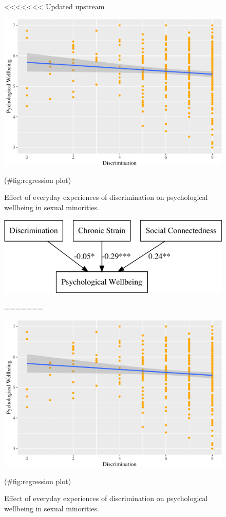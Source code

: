 \documentclass[
  english,
  man,floatsintext]{apa6}
\begin{document}
\begin{figure}
<<<<<<< Updated upstream

{\centering \includegraphics{prep_script_files/figure-latex/regression plot-1} 

}

\caption{Effect of everyday experiences of discrimination on psychological wellbeing in sexual minorities.}(\#fig:regression plot)
\end{figure}

\begin{figure}

{\centering \includegraphics{prep_script_files/figure-latex/lavaan plot-1} 

}

=======

{\centering \includegraphics{prep_script_files/figure-latex/regression plot-1} 

}

\caption{Effect of everyday experiences of discrimination on psychological wellbeing in sexual minorities.}(\#fig:regression plot)
\end{figure}
\end{document}
